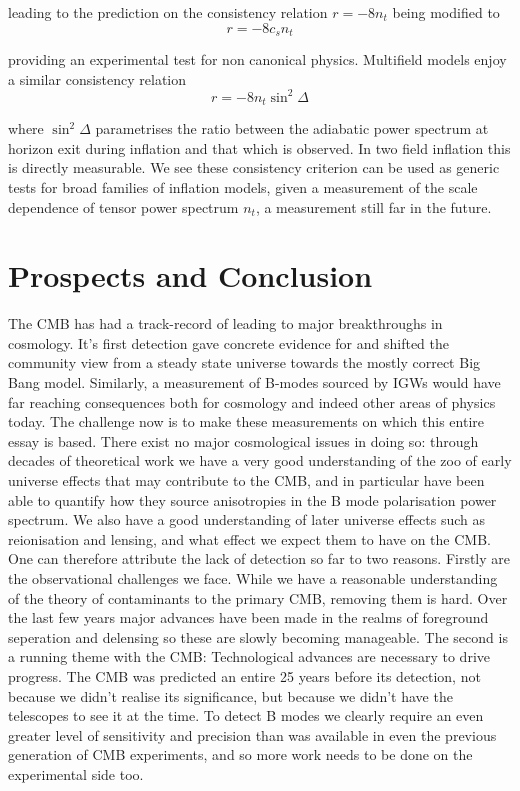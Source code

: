 \documentclass[a4paper,10pt]{article}
\begin{document}
leading to the prediction on the consistency relation $r=-8n_t$ being modified to 
\begin{equation}
r=-8c_sn_t
\end{equation}

providing an experimental test for non canonical physics. Multifield models enjoy a similar consistency relation 
\begin{equation}
r=-8n_t\sin^2\Delta
\end{equation}

where $\sin^2\Delta$ parametrises the ratio between the adiabatic power spectrum at horizon exit during inflation and that which is observed. In two field inflation this is directly measurable. We see these consistency criterion can be used as generic tests for broad families of inflation models, given a measurement of the scale dependence of tensor power spectrum $n_t$, a measurement still far in the future.

\newpage
\section{Prospects and Conclusion}

The CMB has had a track-record of leading to major breakthroughs in cosmology. It's first detection gave concrete evidence for and shifted the community view from a steady state universe towards the mostly correct Big Bang model. Similarly, a measurement of B-modes sourced by IGWs would have far reaching consequences both for cosmology and indeed other areas of physics today. The challenge now is to make these measurements on which this entire essay is based. There exist no major cosmological issues in doing so: through decades of theoretical work we have a very good understanding of the zoo of early universe effects that may contribute to the CMB, and in particular have been able to quantify how they source anisotropies in the B mode polarisation power spectrum. We also have a good understanding of later universe effects such as reionisation and lensing, and what effect we expect them to have on the CMB. \\

One can therefore attribute the lack of detection so far to two reasons. Firstly are the observational challenges we face. While we have a reasonable understanding of the theory of contaminants to the primary CMB, removing them is hard. Over the last few years major advances have been made in the realms of foreground seperation and delensing so these are slowly becoming manageable. The second is a running theme with the CMB: Technological advances are necessary to drive progress. The CMB was predicted an entire 25 years before its detection, not because we didn't realise its significance, but because we didn't have the telescopes to see it at the time. To detect B modes we clearly require an even greater level of sensitivity and precision than was available in even the previous generation of CMB experiments, and so more work needs to be done on the experimental side too.\\
\end{document}
